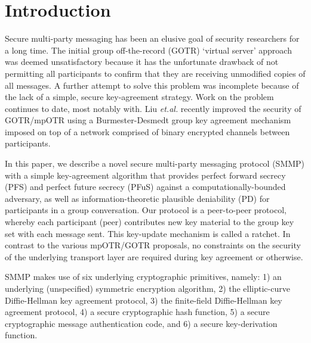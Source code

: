 \documentclass[%
preprint,
amsmath,amssymb,
aps,
prb,
floatfix,
]{revtex4-1}
\begin{document}
\section{\label{sec:Introduction}Introduction}
Secure multi-party messaging has been an elusive goal of security researchers
for a long time. The initial group off-the-record (GOTR) `virtual server'
approach\cite{ref:bian} was deemed unsatisfactory
because it has the unfortunate drawback of not permitting all participants to
confirm that they are receiving unmodified copies of all messages.
A further attempt to solve this problem\cite{ref:goldberg} was incomplete
because of the lack of a simple, secure key-agreement
strategy. Work on the problem
continues to date, most notably with\cite{ref:cryptocat}.
Liu \textit{et.al.}\cite{ref:liu}
recently improved the security of GOTR/mpOTR using a Burmester-Desmedt group
key agreement mechanism imposed on top of a network comprised of binary
encrypted channels between participants.

In this paper, we describe a novel secure multi-party messaging protocol (SMMP) with a
simple key-agreement algorithm that provides perfect forward secrecy (PFS) and
perfect future secrecy (PFuS) against a computationally-bounded adversary,
as well as information-theoretic plausible deniability (PD) for participants
in a group conversation. Our protocol
is a peer-to-peer protocol, whereby each participant (peer) contributes new
key material to the group key set with each message sent.
This key-update mechanism is called a ratchet.
In contrast to the various mpOTR/GOTR proposals, no constraints on the security
of the underlying transport layer are required during key agreement or otherwise.

SMMP makes use of six underlying cryptographic primitives, namely: 1) an
underlying (unspecified) symmetric encryption algorithm, 2) the elliptic-curve
Diffie-Hellman key agreement protocol, 3) the finite-field Diffie-Hellman key
agreement protocol, 4) a secure cryptographic hash function, 5) a secure
cryptographic message authentication code, and 6) a secure key-derivation
function.
\end{document}
